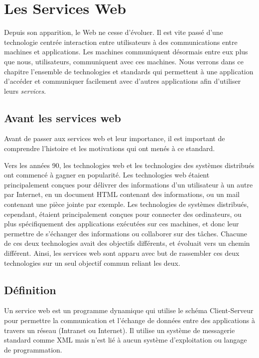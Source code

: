 \chapter{Les Services Web}

Depuis son apparition, le Web ne cesse d'évoluer. Il est vite passé d'une technologie centrée interaction entre utilisateurs à des communications entre machines et applications. Les machines communiquent désormais entre eux plus que nous, utilisateurs, communiquent avec ces machines.
Nous verrons dans ce chapitre l'ensemble de technologies et standards qui permettent à une application d'accéder et communiquer facilement avec d'autres applications afin d'utiliser leurs \emph{services}.
		
\section{Avant les services web}
Avant de passer aux services web et leur importance, il est important de comprendre l'histoire et les motivations qui ont menés à ce standard.
		
Vers les années 90, les technologies web et les technologies des systèmes distribués ont commencé à gagner en popularité. Les technologies web étaient principalement conçues pour délivrer des informations d'un utilisateur à un autre par Internet, en un document HTML contenant des informations, ou un mail contenant une pièce jointe par exemple. Les technologies de systèmes distribués, cependant, étaient principalement conçues pour connecter des ordinateurs, ou plus spécifiquement des applications exécutées sur ces machines, et donc leur permettre de s'échanger des informations ou collaborer sur des tâches.
Chacune de ces deux technologies avait des objectifs différents, et évoluait vers un chemin différent. Ainsi, les services web sont apparu avec but de rassembler ces deux technologies sur un seul objectif commun reliant les deux\cite{W3Road}.

\section{Définition}
Un service web est un programme dynamique qui utilise le schéma Client-Serveur pour permettre la communication et l'échange de données entre des applications à travers un réseau (Intranet ou Internet).
Il utilise un système de messagerie standard comme XML mais n'est lié à aucun système d'exploitation ou langage de programmation.

